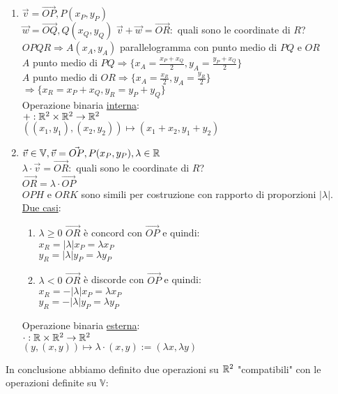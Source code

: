 \documentclass{article}
\begin{document}
\begin{enumerate}
	\item $\vec{v}=\vec{OP},P(x_P,y_P)$\\
	      $\vec{w}=\vec{OQ},Q(x_Q,y_Q)$
	      $\vec{v}+\vec{w}=\vec{OR}:$ quali sono le coordinate di $R$?\\
	      $OPQR\Rightarrow A(x_A,y_A)$ parallelogramma con punto medio di $PQ$ e $OR$\\
	      $A$ punto medio di $PQ\Rightarrow\{x_A=\frac{x_P+x_Q}{2},y_A=\frac{y_P+x_Q}{2}\}$\\
	      $A$ punto medio di $OR\Rightarrow\{x_A=\frac{x_R}{2},y_A=\frac{y_R}{2}\}$\\
	      $\Rightarrow\{x_R=x_P+x_Q,y_R=y_P+y_Q\}$\\
	      Operazione binaria \ul{interna}:\\
	      $+:\mathbb{R}^2\times\mathbb{R}^2\rightarrow\mathbb{R}^2$\\
	      $((x_1,y_1),(x_2,y_2))\mapsto(x_1+x_2,y_1+y_2)$
	\item $\vec{v}\in\mathbb{V},\vec{v}=\vec{OP},P(x_P,y_P),\lambda\in\mathbb{R}$\\
	      $\lambda\cdot\vec{v}=\vec{OR}:$ quali sono le coordinate di $R$?\\
	      $\vec{OR}=\lambda\cdot\vec{OP}$\\
	      $OPH$ e $ORK$ sono simili per costruzione con rapporto di proporzioni $|\lambda|$.\\
	      \ul{Due casi}:
	      \begin{enumerate}
		      \item $\lambda\ge0$ $\vec{OR}$ è concord con $\vec{OP}$ e quindi:\\
		            $x_R=|\lambda|x_P=\lambda x_P$\\
		            $y_R=|\lambda|y_P=\lambda y_P$
		      \item $\lambda<0$ $\vec{OR}$ è discorde con $\vec{OP}$ e quindi:\\
		            $x_R=-|\lambda|x_P=\lambda x_P$\\
		            $y_R=-|\lambda|y_P=\lambda y_P$
	      \end{enumerate}
	      Operazione binaria \ul{esterna}:\\
	      $\cdot:\mathbb{R}\times\mathbb{R}^2\rightarrow\mathbb{R}^2$\\
	      \hspace*{0.1em}$(y,(x,y))\mapsto\lambda\cdot(x,y):=(\lambda x,\lambda y)$
\end{enumerate}
In conclusione abbiamo definito due operazioni su $\mathbb{R}^2$ "compatibili" con le operazioni definite su $\mathbb{V}$:
\end{document}
